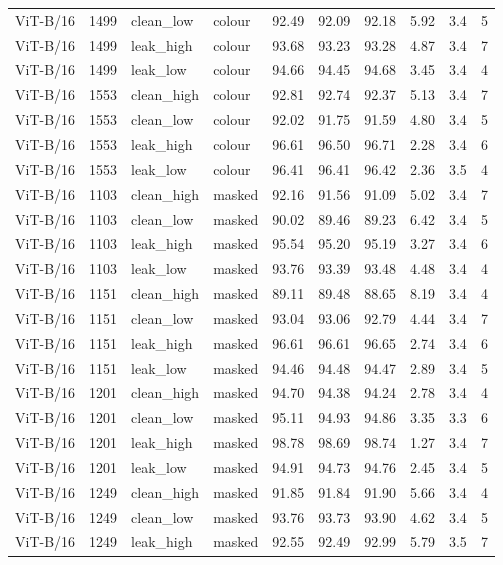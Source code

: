 {\begin{longtable}{lrllrrrrrr}
ViT-B/16 & 1499 & clean\_low & colour & 92.49 & 92.09 & 92.18 & 5.92 & 3.4 & 5 \\
ViT-B/16 & 1499 & leak\_high & colour & 93.68 & 93.23 & 93.28 & 4.87 & 3.4 & 7 \\
ViT-B/16 & 1499 & leak\_low & colour & 94.66 & 94.45 & 94.68 & 3.45 & 3.4 & 4 \\
ViT-B/16 & 1553 & clean\_high & colour & 92.81 & 92.74 & 92.37 & 5.13 & 3.4 & 7 \\
ViT-B/16 & 1553 & clean\_low & colour & 92.02 & 91.75 & 91.59 & 4.80 & 3.4 & 5 \\
ViT-B/16 & 1553 & leak\_high & colour & 96.61 & 96.50 & 96.71 & 2.28 & 3.4 & 6 \\
ViT-B/16 & 1553 & leak\_low & colour & 96.41 & 96.41 & 96.42 & 2.36 & 3.5 & 4 \\
ViT-B/16 & 1103 & clean\_high & masked & 92.16 & 91.56 & 91.09 & 5.02 & 3.4 & 7 \\
ViT-B/16 & 1103 & clean\_low & masked & 90.02 & 89.46 & 89.23 & 6.42 & 3.4 & 5 \\
ViT-B/16 & 1103 & leak\_high & masked & 95.54 & 95.20 & 95.19 & 3.27 & 3.4 & 6 \\
ViT-B/16 & 1103 & leak\_low & masked & 93.76 & 93.39 & 93.48 & 4.48 & 3.4 & 4 \\
ViT-B/16 & 1151 & clean\_high & masked & 89.11 & 89.48 & 88.65 & 8.19 & 3.4 & 4 \\
ViT-B/16 & 1151 & clean\_low & masked & 93.04 & 93.06 & 92.79 & 4.44 & 3.4 & 7 \\
ViT-B/16 & 1151 & leak\_high & masked & 96.61 & 96.61 & 96.65 & 2.74 & 3.4 & 6 \\
ViT-B/16 & 1151 & leak\_low & masked & 94.46 & 94.48 & 94.47 & 2.89 & 3.4 & 5 \\
ViT-B/16 & 1201 & clean\_high & masked & 94.70 & 94.38 & 94.24 & 2.78 & 3.4 & 4 \\
ViT-B/16 & 1201 & clean\_low & masked & 95.11 & 94.93 & 94.86 & 3.35 & 3.3 & 6 \\
ViT-B/16 & 1201 & leak\_high & masked & 98.78 & 98.69 & 98.74 & 1.27 & 3.4 & 7 \\
ViT-B/16 & 1201 & leak\_low & masked & 94.91 & 94.73 & 94.76 & 2.45 & 3.4 & 5 \\
ViT-B/16 & 1249 & clean\_high & masked & 91.85 & 91.84 & 91.90 & 5.66 & 3.4 & 4 \\
ViT-B/16 & 1249 & clean\_low & masked & 93.76 & 93.73 & 93.90 & 4.62 & 3.4 & 5 \\
ViT-B/16 & 1249 & leak\_high & masked & 92.55 & 92.49 & 92.99 & 5.79 & 3.5 & 7 \\

\end{longtable}}
